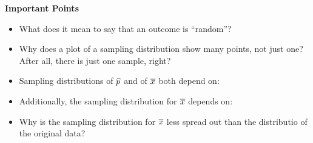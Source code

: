  

{\bf Important Points}
\begin{itemize}
\item What does it mean to say that an outcome is ``random''?\vfill
\item Why does a plot of a sampling distribution show many points, not
  just one? After all, there is just one sample, right?\vfill
\item Sampling distributions of $\widehat{p}$ and of $\overline{x}$ both depend on:
  \vfill
\item Additionally, the sampling distribution for $\overline{x}$ depends
  on:\vfill
\item Why is the sampling distribution for $\overline{x}$ less spread out
  than the distributio of the original data?
\end{itemize}



